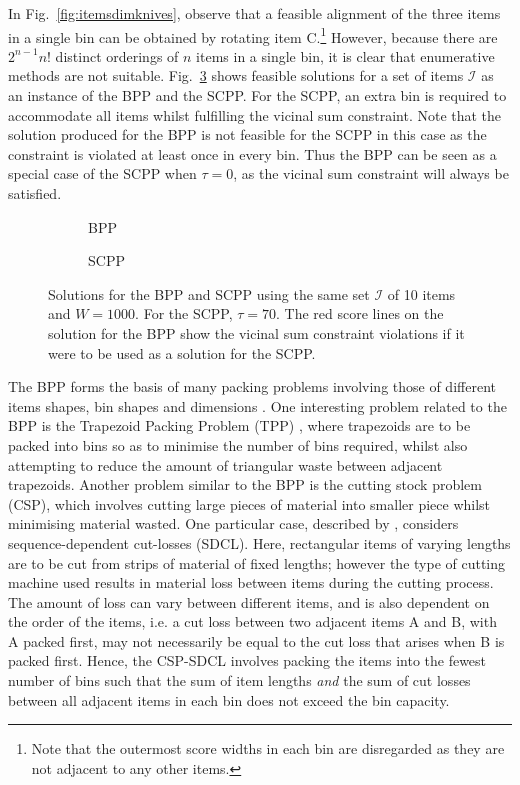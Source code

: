 \documentclass[a4paper,11pt,authoryear]{elsarticle}
\begin{document}
In Fig.~\ref{fig:itemsdimknives}, observe that a feasible alignment of the three items in a single bin can be obtained by rotating item C.\footnote{Note that the outermost score widths in each bin are disregarded as they are not adjacent to any other items.} However, because there are $2^{n-1} n!$ distinct orderings of $n$ items in a single bin, it is clear that enumerative methods are not suitable. Fig.~\ref{fig:bppvscpp} shows feasible solutions for a set of items $\mathcal{I}$ as an instance of the BPP and the SCPP. For the SCPP, an extra bin is required to accommodate all items whilst fulfilling the vicinal sum constraint. Note that the solution produced for the BPP is not feasible for the SCPP in this case as the constraint is violated at least once in every bin. Thus the BPP can be seen as a special case of the SCPP when $\tau=0$, as the vicinal sum constraint will always be satisfied.

\begin{figure}[H]
	\centering	
	\begin{subfigure}[h]{0.42\textwidth}
		
		\caption{BPP}
		\label{fig:bpp}
	\end{subfigure} \hspace{10mm}
	\begin{subfigure}[h]{0.42\textwidth}
		
		\caption{SCPP}
		\label{fig:scpp}
	\end{subfigure}
	\caption{Solutions for the BPP and SCPP using the same set $\mathcal{I}$ of 10 items and $W = 1000$. For the SCPP, $\tau = 70$. The red score lines on the solution for the BPP show the vicinal sum constraint violations if it were to be used as a solution for the SCPP.}	
	\label{fig:bppvscpp}
\end{figure}

\noindent The BPP forms the basis of many packing problems involving those of different items shapes, bin shapes and dimensions \citep{haouari2009, kenmochi2009, xavier2008}. One interesting problem related to the BPP is the Trapezoid Packing Problem (TPP) \citep{lewis2011, lewis2017}, where trapezoids are to be packed into bins so as to minimise the number of bins required, whilst also attempting to reduce the amount of triangular waste between adjacent trapezoids. Another problem similar to the BPP is the cutting stock problem (CSP), which involves cutting large pieces of material into smaller piece whilst minimising material wasted. One particular case, described by \cite{garraffa2016}, considers sequence-dependent cut-losses (SDCL). Here, rectangular items of varying lengths are to be cut from strips of material of fixed lengths; however the type of cutting machine used results in material loss between items during the cutting process. The amount of loss can vary between different items, and is also dependent on the order of the items, i.e. a cut loss between two adjacent items A and B, with A packed first, may not necessarily be equal to the cut loss that arises when B is packed first. Hence, the CSP-SDCL involves packing the items into the fewest number of bins such that the sum of item lengths \emph{and} the sum of cut losses between all adjacent items in each bin does not exceed the bin capacity.
\end{document}
